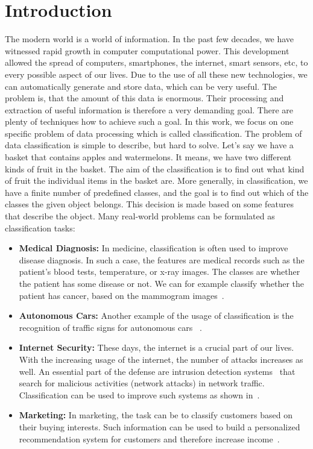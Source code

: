 \chapter*{Introduction}

The modern world is a world of information. In the past few decades, we have witnessed rapid growth in computer computational power. This development allowed the spread of computers, smartphones, the internet, smart sensors, etc, to every possible aspect of our lives. Due to the use of all these new technologies, we can automatically generate and store data, which can be very useful. The problem is, that the amount of this data is enormous. Their processing and extraction of useful information is therefore a very demanding goal. There are plenty of techniques how to achieve such a goal. In this work, we focus on one specific problem of data processing which is called classification. The problem of data classification is simple to describe, but hard to solve. Let's say we have a basket that contains apples and watermelons. It means, we have two different kinds of fruit in the basket. The aim of the classification is to find out what kind of fruit the individual items in the basket are. More generally, in classification, we have a finite number of predefined classes, and the goal is to find out which of the classes the given object belongs. This decision is made based on some features that describe the object. Many real-world problems can be formulated as classification tasks:
\begin{itemize}
  \item \textbf{Medical Diagnosis:} In medicine, classification is often used to improve disease diagnosis. In such a case, the features are medical records such as the patient's blood tests, temperature, or x-ray images. The classes are whether the patient has some disease or not. We can for example classify whether the patient has cancer, based on the mammogram images~\cite{viale2012current, levy2016breast}.
  \item \textbf{Autonomous Cars:} Another example of the usage of classification is the recognition of traffic signs for autonomous cars ~\cite{swaminathan2019autonomous}.
  \item \textbf{Internet Security:} These days, the internet is a crucial part of our lives. With the increasing usage of the internet, the number of attacks increases as well. An essential part of the defense are intrusion detection systems~\cite{grill2016learning, scarfone2007guide} that search for malicious activities (network attacks) in network traffic. Classification can be used to improve such systems as shown in~\cite{giacinto2002intrusion, shanbhag2009accurate}.
  \item \textbf{Marketing:} In marketing, the task can be to classify customers based on their buying interests. Such information can be used to build a personalized recommendation system for customers and therefore increase income~\cite{kaefer2005neural, zhang2007building}.
\end{itemize}
